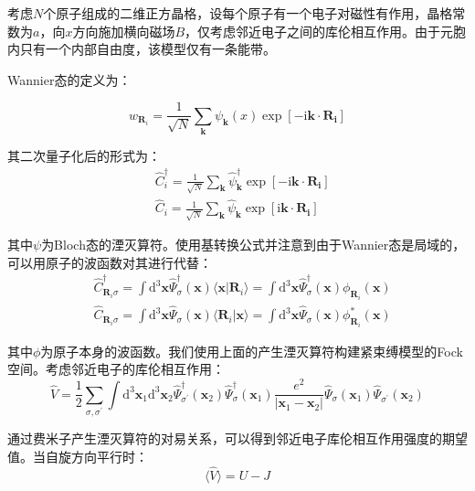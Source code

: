 \documentclass[UTF8]{ctexart}
\begin{document}
考虑$N$个原子组成的二维正方晶格，设每个原子有一个电子对磁性有作用，晶格常数为$a$，向$x$方向施加横向磁场$B$，仅考虑邻近电子之间的库伦相互作用。由于元胞内只有一个内部自由度，该模型仅有一条能带。\par
Wannier态的定义为：\par
\begin{equation}
    w_{\mathbf{R}_i}=\frac{1}{\sqrt{N}}\sum_{\mathbf{k}}\psi_\mathbf{k}(x) \exp[-\mathrm{i} \mathbf{k}\cdot \mathbf{R_i}]
\end{equation}
\par
其二次量子化后的形式为：
\begin{align}
    &\hat{C}^\dagger_i=\frac{1}{\sqrt{N}}\sum_\mathbf{k}\hat{\psi}^\dagger_\mathbf{k}\exp[-\mathrm{i} \mathbf{k}\cdot \mathbf{R_i}]\\
    &\hat{C}_i=\frac{1}{\sqrt{N}}\sum_\mathbf{k}\hat{\psi}_\mathbf{k}\exp[\mathrm{i} \mathbf{k}\cdot \mathbf{R_i}]
\end{align}
\par
其中$\psi$为Bloch态的湮灭算符。使用基转换公式并注意到由于Wannier态是局域的，可以用原子的波函数对其进行代替：
\begin{align}
    &\hat{C}^\dagger_{\mathbf{R}_i\sigma}=\int \mathrm{d}^3\mathbf{x} \hat{\Psi}^\dagger_\sigma(\mathbf{x})\langle \mathbf{x}|\mathbf{R}_i\rangle=\int \mathrm{d}^3\mathbf{x} \hat{\Psi}^\dagger_\sigma(\mathbf{x})\phi_{\mathbf{R}_i}(\mathbf{x})\\
    &\hat{C}_{\mathbf{R}_i\sigma}=\int \mathrm{d}^3\mathbf{x} \hat{\Psi}_\sigma(\mathbf{x})\langle \mathbf{R}_i|\mathbf{x}\rangle=\int \mathrm{d}^3\mathbf{x} \hat{\Psi}_\sigma(\mathbf{x})\phi^*_{\mathbf{R}_i}(\mathbf{x})
\end{align}
\par
其中$\phi$为原子本身的波函数。我们使用上面的产生湮灭算符构建紧束缚模型的Fock空间。考虑邻近电子的库伦相互作用：
\begin{equation}
    \hat{V}=\frac{1}{2}\sum_{\sigma,\sigma^\prime}\int \mathrm{d}^3\mathbf{x}_1 \mathrm{d}^3\mathbf{x}_2 \hat{\Psi}^\dagger_{\sigma^\prime}(\mathbf{x}_2)\hat{\Psi}^\dagger_{\sigma}(\mathbf{x}_1)\frac{e^2}{|\mathbf{x}_1-\mathbf{x}_2|}\hat{\Psi}_{\sigma}(\mathbf{x}_1)\hat{\Psi}_{\sigma^\prime}(\mathbf{x}_2)
\end{equation}
\par
通过费米子产生湮灭算符的对易关系，可以得到邻近电子库伦相互作用强度的期望值。当自旋方向平行时：
\begin{equation}
    \langle \hat{V} \rangle = U-J
\end{equation}
\end{document}
